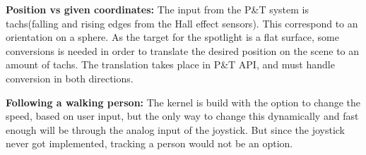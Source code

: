 \textbf{Position vs given coordinates:} The input from the P\&T system is tachs(falling and rising edges from the Hall effect sensors). This correspond to an orientation on a sphere. As the target for the spotlight is a flat surface, some conversions is needed in order to translate the desired position on the scene to an amount of tachs. The translation takes place in P\&T API, and must handle conversion in both directions.
 
 
\textbf{Following a walking person:} The kernel is build with the option to change the speed, based on user input, but the only way to change this dynamically and fast enough will be through the analog input of the joystick. But since the joystick never got implemented, tracking a person would not be an option.
 




